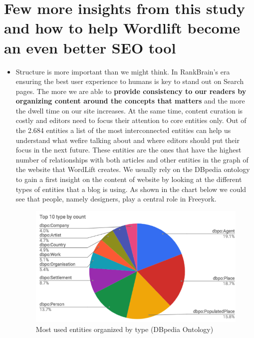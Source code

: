 \documentclass[runningheads,a4paper]{llncs}
\makeatletter
\def\maxwidth#1{\ifdim\Gin@nat@width>#1 #1\else\Gin@nat@width\fi}
\makeatother
\begin{document}
\section{Few more insights from this study and how to help Wordlift become an even better SEO tool 
}
\begin{itemize}
\item Structure is more important than we might think. In RankBrain's
 era ensuring the best user experience to humans is key to
 stand out on Search pages. The more we are able to {\bf provide consistency to our readers by organizing content around the concepts that matters }and the more
 the dwell time on our site increases. At the same time, content curation is costly and editors need to focus their
 attention to core entities only. Out of the 2.684 entities a list
 of the most interconnected entities can help us understand
 what wefire talking about and where editors should put
 their focus in the next future. These entities are the ones
 that have the highest number of relationships with both
 articles and other entities in the graph of the website that
 WordLift creates. We usually rely on the DBpedia ontology
 to gain a first insight on the content of website by looking
 at the different types of entities that a blog is using. As
 shown in the chart below we could see that people, namely
 designers, play a central role in Freeyork.
\begin{figure}[h!]
\centering
\includegraphics[width=\maxwidth{\textwidth}]{img/100002010000026F0000015AB0677FF7.png}
\cprotect\caption{Most used entities organized by type (DBpedia Ontology)}
\label{}
\end{figure}



\end{itemize}
\end{document}
